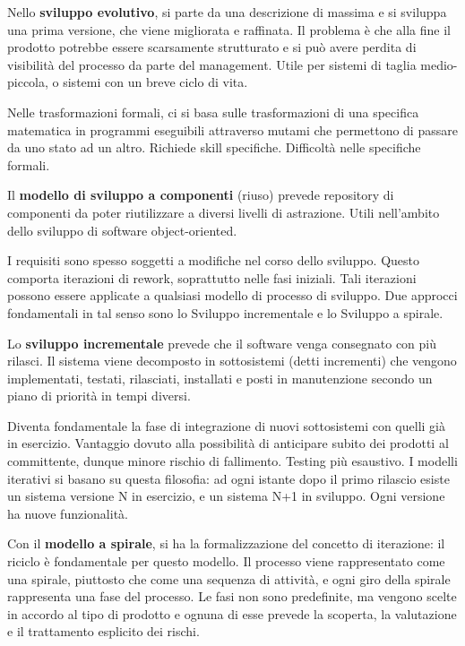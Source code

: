 \documentclass{article}
\begin{document}
        Nello \textbf{sviluppo evolutivo}, si parte da una descrizione di massima e si sviluppa una prima versione, che viene migliorata e raffinata. Il problema è che alla fine il prodotto potrebbe essere scarsamente strutturato e si può avere perdita di visibilità del processo da parte del management. Utile per sistemi di taglia medio-piccola, o sistemi con un breve ciclo di vita.
        
        Nelle trasformazioni formali, ci si basa sulle trasformazioni di una specifica matematica in programmi eseguibili attraverso mutami che permettono di passare da uno stato ad un altro. Richiede skill specifiche. Difficoltà nelle specifiche formali. 
        
        \vspace{3mm}
        
        Il \textbf{modello di sviluppo a componenti} (riuso) prevede repository di componenti da poter riutilizzare a diversi livelli di astrazione. Utili nell’ambito dello sviluppo di software object-oriented.
        
        I requisiti sono spesso soggetti a modifiche nel corso dello sviluppo. Questo comporta iterazioni di rework, soprattutto nelle fasi iniziali. Tali iterazioni possono essere applicate a qualsiasi modello di processo di sviluppo. Due approcci fondamentali in tal senso sono lo Sviluppo incrementale e lo Sviluppo a spirale.
        
        \vspace{3mm}
        
        Lo \textbf{sviluppo incrementale} prevede che il software venga consegnato con più rilasci. Il sistema viene decomposto in sottosistemi (detti incrementi) che vengono implementati, testati, rilasciati, installati e posti in manutenzione secondo un piano di priorità in tempi diversi. 
        
        Diventa fondamentale la fase di integrazione di nuovi sottosistemi con quelli già in esercizio. Vantaggio dovuto alla possibilità di anticipare subito dei prodotti al committente, dunque minore rischio di fallimento. Testing più esaustivo. I modelli iterativi si basano su questa filosofia: ad ogni istante dopo il primo rilascio esiste un sistema versione N in esercizio, e un sistema N+1 in sviluppo. Ogni versione ha nuove funzionalità.

        \vspace{3mm}
    
        Con il \textbf{modello a spirale}, si ha la formalizzazione del concetto di iterazione: il riciclo è fondamentale per questo modello. Il processo viene rappresentato come una spirale, piuttosto che come una sequenza di attività, e ogni giro della spirale rappresenta una fase del processo. Le fasi non sono predefinite, ma vengono scelte in accordo al tipo di prodotto e ognuna di esse prevede la scoperta, la valutazione e il trattamento esplicito dei rischi. 
    
\end{document}
